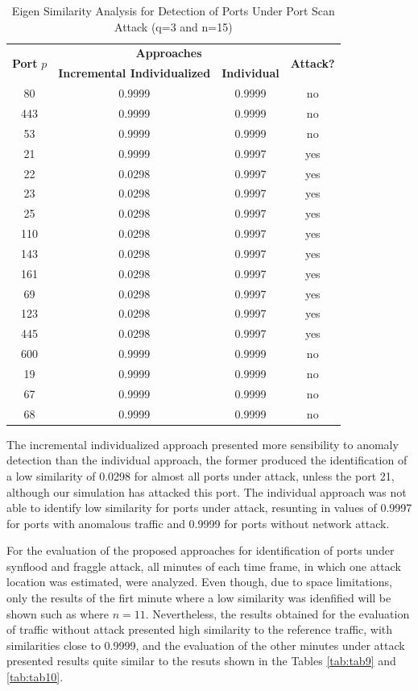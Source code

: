 \documentclass{bmcart}
\begin{document}
\begin{table}[h!]
  \centering
  \footnotesize
  \caption{Eigen Similarity Analysis for Detection of Ports Under Port Scan Attack (q=3 and n=15)}
  \label{tab:tab8}
  \begin{tabular}{ c c c c }
	\toprule
	\multirow{2}{*}{\textbf{Port} $p$}   &\multicolumn{2}{c}{\textbf{Approaches}} &\multirow{2}{*}{\textbf{Attack?}}\\ 
			\hhline{~--~}
			&\textbf{Incremental Individualized} &\textbf{Individual}\\
	\midrule
	80 &0.9999 &0.9999 &no \\
	443 &0.9999 &0.9999 &no \\
	53 &0.9999 &0.9999 &no \\
	21 &0.9999 &0.9997 &yes \\
	22 &0.0298 &0.9997 &yes \\
	23 &0.0298 &0.9997 &yes \\
	25 &0.0298 &0.9997 &yes \\
	110 &0.0298 &0.9997 &yes \\
	143 &0.0298 &0.9997 &yes \\
	161 &0.0298 &0.9997 &yes \\
	69 &0.0298 &0.9997 &yes \\
	123 &0.0298 &0.9997 &yes \\
	445 &0.0298 &0.9997 &yes \\
	600 &0.9999 &0.9999 &no \\
	19 &0.9999 &0.9999 &no \\
	67 &0.9999 &0.9999 &no \\
	68 &0.9999 &0.9999 &no \\
    \bottomrule
  \end{tabular}
\end{table}

The incremental individualized approach presented more sensibility to anomaly detection than the individual approach, the former produced the identification of a low similarity of 0.0298 for almost all ports under attack, unless the port 21, although our simulation has attacked this port. The individual approach was not able to identify low similarity for ports under attack, resunting in values of 0.9997 for ports with anomalous traffic and 0.9999 for ports without network attack.

For the evaluation of the proposed approaches for identification of ports under synflood and fraggle attack, all minutes of each time frame, in which one attack location was estimated, were analyzed. Even though, due to space limitations, only the results of the firt minute where a low similarity was idenfified will be shown such as where $n=11$. Nevertheless, the results obtained for the evaluation of traffic without attack presented high similarity to the reference traffic, with similarities close to 0.9999, and the evaluation of the other minutes under attack presented results quite similar to the resuts shown in the Tables \ref{tab:tab9} and \ref{tab:tab10}.
\end{document}

